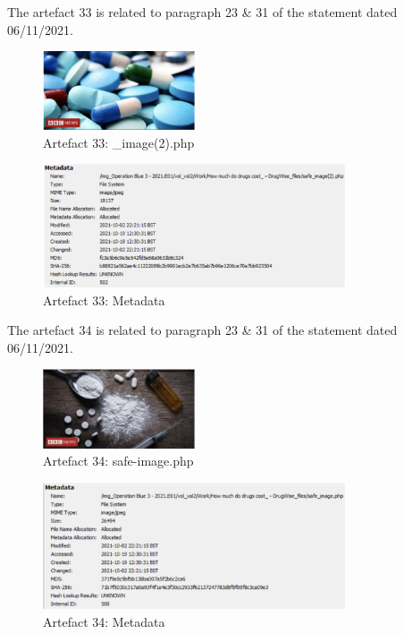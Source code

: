 The artefact 33 is related to paragraph 23 \& 31 of the statement
dated 06/11/2021.
\begin{figure}[H]
  \centering
  \includegraphics[width=0.4\textwidth]{figures/artefact33}
  \caption{Artefact 33: \_image(2).php}
  \label{f:artefact33}
\end{figure}
\begin{figure}[H]
  \centering
  \includegraphics[width=0.8\textwidth]{figures/meta33}
  \caption{Artefact 33: Metadata}
  \label{f:meta33}
\end{figure}
The artefact 34 is related to paragraph 23 \& 31 of the statement
dated 06/11/2021.
\begin{figure}[H]
  \centering
  \includegraphics[width=0.4\textwidth]{figures/artefact34}
  \caption{Artefact 34: safe-image.php}
  \label{f:artefact34}
\end{figure}
\begin{figure}[H]
  \centering
  \includegraphics[width=0.8\textwidth]{figures/meta34}
  \caption{Artefact 34: Metadata}
  \label{f:meta34}
\end{figure}
